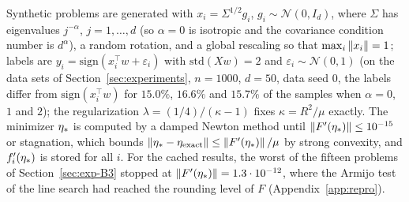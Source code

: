 Synthetic problems are generated with $x_i = \Sigma^{1/2} g_i$, $g_i \sim \mathcal N(0, I_d)$, where $\Sigma$ has
eigenvalues $j^{-\alpha}$, $j = 1, \dots, d$ (so $\alpha = 0$ is isotropic and the covariance condition number is
$d^\alpha$), a random rotation, and a global rescaling so that $\max_i\left\|x_i\right\| = 1$; labels are
$y_i = \mathrm{sign}(x_i^\top w + \varepsilon_i)$ with $\mathrm{std}(Xw) = 2$ and $\varepsilon_i \sim \mathcal N(0,1)$
(on the data sets of Section~\ref{sec:experiments}, $n=1000$, $d=50$, data seed $0$, the labels differ from
$\mathrm{sign}(x_i^\top w)$ for $15.0\%$, $16.6\%$ and $15.7\%$ of the samples when $\alpha=0$, $1$ and $2$); the
regularization $\lambda = (1/4)/(\kappa - 1)$ fixes $\kappa = R^2/\mu$ exactly. The minimizer $\eta_\ast$ is computed by
a damped Newton method until $\left\|F'(\eta_\ast)\right\| \le 10^{-15}$ or stagnation, which bounds
$\left\|\eta_\ast - \eta_{\rm exact}\right\| \le \left\|F'(\eta_\ast)\right\|/\mu$ by strong convexity, and $f'_i(\eta_\ast)$ is stored
for all $i$. For the cached results, the worst of the fifteen problems of Section~\ref{sec:exp-B3} stopped at
$\left\|F'(\eta_\ast)\right\|=1.3\cdot10^{-12}$, where the Armijo test of the line search had reached the rounding level of $F$
(Appendix~\ref{app:repro}).

